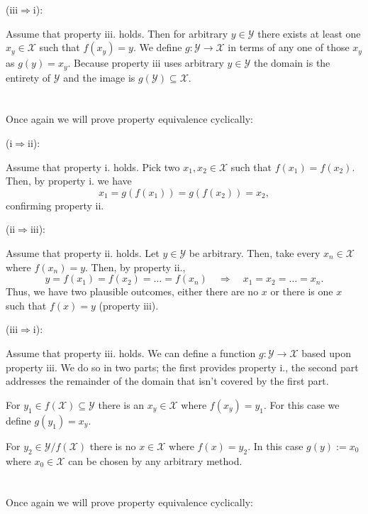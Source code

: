 \documentclass[12 pt,letterpaper]{article}
\begin{document}
\vspace{5pt}\noindent
(iii\(\Rightarrow\)i):

Assume that property iii. holds.
Then for arbitrary \(y\in\mathcal{Y}\)
there exists at least one \(x_y\in\mathcal{X}\) such that \(f(x_y)=y\).
We define \(g:\mathcal{Y}\rightarrow\mathcal{X}\) 
in terms of any one of those \(x_y\) as \(g(y)=x_y\).
Because property iii uses arbitrary \(y\in\mathcal{Y}\)
the domain is the entirety of \(\mathcal{Y}\) 
and the image is \(g(\mathcal{Y})\subseteq\mathcal{X}\).

\section{}
Once again we will prove property equivalence cyclically:

\noindent
(i\(\Rightarrow\)ii):

Assume that property i. holds.
Pick two \(x_1,x_2\in\mathcal{X}\) such that \(f(x_1)=f(x_2)\).
Then, by property i. we have
\[x_1 = g(f(x_1)) = g(f(x_2)) = x_2,\]
confirming property ii.

\vspace{5pt}\noindent
(ii\(\Rightarrow\)iii):

Assume that property ii. holds.
Let \(y\in\mathcal{Y}\) be arbitrary.
Then, take every \(x_n\in\mathcal{X}\) where \(f(x_n) = y\).
Then, by property ii.,
\[
    y = f(x_1) = f(x_2) = \ldots = f(x_n)
    \quad\Rightarrow\quad
    x_1 = x_2 = \ldots = x_n.
\]
Thus, we have two plausible outcomes, either there are no \(x\)
or there is one \(x\) such that \(f(x)=y\) (property iii).

\vspace{5pt}\noindent
(iii\(\Rightarrow\)i):

Assume that property iii. holds.
We can define a function \(g:\mathcal{Y}\rightarrow\mathcal{X}\) based upon property iii.
We do so in two parts; the first provides property i., 
the second part addresses the remainder of the domain that isn't covered by the first part.

For \(y_1\in f(\mathcal{X}) \subseteq \mathcal{Y}\)
there is an \(x_y\in\mathcal{X}\) where \(f(x_y)=y_1\).
For this case we define \(g(y_1)=x_y\).

For \(y_2\in\mathcal{Y}/f(\mathcal{X})\) there is no \(x\in\mathcal{X}\)
where \(f(x) = y_2\).
In this case \(g(y):=x_0\) where \(x_0\in\mathcal{X}\) can be chosen by any arbitrary method.

\clearpage
\section{}
Once again we will prove property equivalence cyclically:
\end{document}

